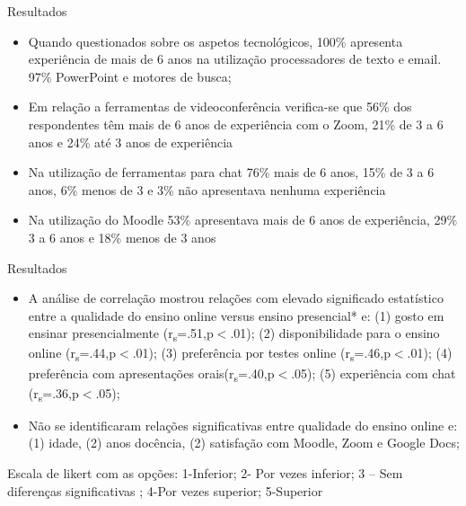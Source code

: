 \documentclass[10pt]{beamer}
\begin{document}
\begin{frame}[fragile]{Resultados}
  	\begin{itemize}
		\item Quando questionados sobre os aspetos tecnológicos, 100\% apresenta experiência de mais de 6 anos na utilização processadores de texto e email. 97\% PowerPoint e motores de busca;
		\item Em relação a ferramentas de videoconferência verifica-se que 56\% dos respondentes têm mais de 6 anos de experiência com o Zoom, 21\% de 3 a 6 anos e 24\% até 3 anos de experiência
		\item Na utilização de ferramentas para chat 76\% mais de 6 anos, 15\% de 3 a 6 anos, 6\% menos de 3 e 3\% não apresentava nenhuma experiência
		\item Na utilização do Moodle 53\% apresentava mais de 6 anos de experiência, 29\% 3 a 6 anos e 18\% menos de 3 anos
	\end{itemize}
\end{frame}

\begin{frame}[fragile]{Resultados}
  	\begin{itemize}
		\item A análise de correlação mostrou relações com elevado significado estatístico entre a qualidade do ensino online versus ensino presencial* e: (1) gosto em ensinar presencialmente (r\textsubscript{s}=.51,p$<$.01); (2) disponibilidade para o ensino online (r\textsubscript{s}=.44,p$<$.01); (3) preferência por testes online (r\textsubscript{s}=.46,p$<$.01); (4) preferência com apresentações orais(r\textsubscript{s}=.40,p$<$.05); (5) experiência com chat (r\textsubscript{s}=.36,p$<$.05);
		\item Não se identificaram relações significativas entre qualidade do ensino online e: (1) idade, (2) anos docência, (2) satisfação com Moodle, Zoom e Google Docs;
	\end{itemize}
	\tiny * Escala de likert com as opções: 1-Inferior; 2- Por vezes inferior; 3 – Sem diferenças significativas ; 4-Por vezes superior;  5-Superior 

\end{frame}
\end{document}
